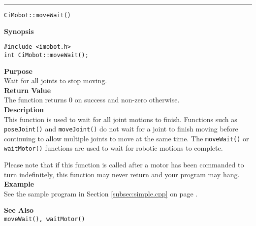 \noindent
\vspace{5pt}
\rule{6.5in}{0.015in}
\noindent
{\LARGE \texttt{CiMobot::moveWait()}}\\
{}

\noindent
{\bf Synopsis}\\
\begin{verbatim}
#include <imobot.h>
int CiMobot::moveWait();
\end{verbatim}

\noindent
{\bf Purpose}\\
Wait for all joints to stop moving.\\

\noindent
{\bf Return Value}\\
The function returns 0 on success and non-zero otherwise.\\

\noindent
{\bf Description}\\
This function is used to wait for all joint motions to finish. Functions such as
\texttt{poseJoint()} and \texttt{moveJoint()} do not wait for a joint to finish
moving before continuing to allow multiple joints to move at the same time. The
\texttt{moveWait()} or \texttt{waitMotor()} functions are used to wait for
robotic motions to complete.

Please note that if this function is called after a motor has been commanded to
turn indefinitely, this function may never return and your program may hang.\\

\noindent
{\bf Example}\\
See the sample program in Section \ref{subsec:simple.cpp} on page \pageref{subsec:simple.cpp}.
\noindent

\noindent
{\bf See Also}\\
\texttt{moveWait(), waitMotor()}


